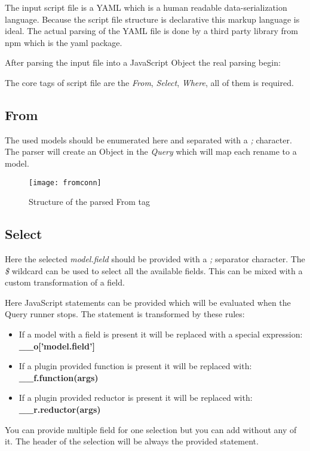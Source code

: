 The input script file is a YAML\cite{yaml} which is a human readable data-serialization language. Because the script file structure is declarative
this markup language is ideal. The actual parsing of the YAML file is done by
a third party library from npm which is the yaml\cite{yaml-pck} package.

After parsing the input file into a JavaScript Object the real parsing begin: 

The core tags of script file are the \textit{From}, \textit{Select}, \textit{Where}, all of them is required.

\subsection{From}
The used models should be enumerated here and separated with a \textit{;} character. The parser will create an Object in the \textit{Query} which will map each rename to a model.

 \begin{figure}[H]
 	\centering
 	\texttt{[image: fromconn]}
 	\caption{Structure of the parsed From tag}
 	\label{fig:fig-help}
 \end{figure}

\subsection{Select}
Here the selected \textit{model.field} should be provided with a \textit{;} 
separator character. The \textit{\$} wildcard can be used to select all the
available fields. This can be mixed with a custom transformation of a field.

Here JavaScript statements can be provided which will be evaluated when the
Query runner stops. The statement is transformed by these rules:

\begin{itemize}
	\item If a model with a field is present it will be replaced with a special expression: \textbf{\_\_o['model.field']}
	\item If a plugin provided function is present it will be replaced with: \textbf{\_\_f.function(args)}
	\item If a plugin provided reductor is present it will be replaced with: \textbf{\_\_r.reductor(args)}
\end{itemize}

You can provide multiple field for one selection but you can add without any of it. The header of the selection
will be always the provided statement.

